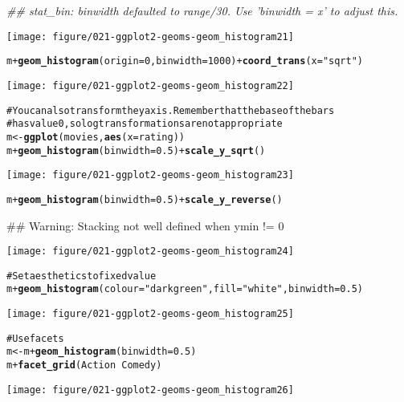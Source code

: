\documentclass[a4paper,titlepage]{tufte-handout}\usepackage{graphicx, color}
\makeatletter
\def\maxwidth{ %
  \ifdim\Gin@nat@width>\linewidth
    \linewidth
  \else
    \Gin@nat@width
  \fi
}
\newcommand{\hlfunctioncall}[1]{\textcolor[rgb]{0.501960784313725,0,0.329411764705882}{\textbf{#1}}}%
\newcommand{\hlstring}[1]{\textcolor[rgb]{0.6,0.6,1}{#1}}%
\newcommand{\hlcomment}[1]{\textcolor[rgb]{0.180392156862745,0.6,0.341176470588235}{#1}}%
\newenvironment{kframe}{%
 \def\at@end@of@kframe{}%
 \ifinner\ifhmode%
  \def\at@end@of@kframe{\end{minipage}}%
  \begin{minipage}{\columnwidth}%
 \fi\fi%
 \def\FrameCommand##1{\hskip\@totalleftmargin \hskip-\fboxsep
 \colorbox{shadecolor}{##1}\hskip-\fboxsep
     \hskip-\linewidth \hskip-\@totalleftmargin \hskip\columnwidth}%
 \MakeFramed {\advance\hsize-\width
   \@totalleftmargin\z@ \linewidth\hsize
   \@setminipage}}%
 {\par\unskip\endMakeFramed%
 \at@end@of@kframe}
\newenvironment{knitrout}{}{} %
\makeatother
\begin{document}
\begin{knitrout}
\begin{kframe}
{\ttfamily\noindent\itshape\textcolor{messagecolor}{\#\# stat\_bin: binwidth defaulted to range/30. Use 'binwidth = x' to adjust this.}}\end{kframe}
\texttt{[image: figure/021-ggplot2-geoms-geom\_histogram21]} 
\begin{kframe}\begin{alltt}
m + \hlfunctioncall{geom_histogram}(origin = 0, binwidth = 1000) + \hlfunctioncall{coord_trans}(x = \hlstring{"sqrt"})
\end{alltt}
\end{kframe}
\texttt{[image: figure/021-ggplot2-geoms-geom\_histogram22]} 
\begin{kframe}\begin{alltt}

\hlcomment{# You can also transform the y axis.  Remember that the base of the bars}
\hlcomment{# has value 0, so log transformations are not appropriate}
m <- \hlfunctioncall{ggplot}(movies, \hlfunctioncall{aes}(x = rating))
m + \hlfunctioncall{geom_histogram}(binwidth = 0.5) + \hlfunctioncall{scale_y_sqrt}()
\end{alltt}
\end{kframe}
\texttt{[image: figure/021-ggplot2-geoms-geom\_histogram23]} 
\begin{kframe}\begin{alltt}
m + \hlfunctioncall{geom_histogram}(binwidth = 0.5) + \hlfunctioncall{scale_y_reverse}()
\end{alltt}


{\ttfamily\noindent\textcolor{warningcolor}{\#\# Warning: Stacking not well defined when ymin != 0}}\end{kframe}
\texttt{[image: figure/021-ggplot2-geoms-geom\_histogram24]} 
\begin{kframe}\begin{alltt}

\hlcomment{# Set aesthetics to fixed value}
m + \hlfunctioncall{geom_histogram}(colour = \hlstring{"darkgreen"}, fill = \hlstring{"white"}, binwidth = 0.5)
\end{alltt}
\end{kframe}
\texttt{[image: figure/021-ggplot2-geoms-geom\_histogram25]} 
\begin{kframe}\begin{alltt}

\hlcomment{# Use facets}
m <- m + \hlfunctioncall{geom_histogram}(binwidth = 0.5)
m + \hlfunctioncall{facet_grid}(Action ~ Comedy)
\end{alltt}
\end{kframe}
\texttt{[image: figure/021-ggplot2-geoms-geom\_histogram26]} 
\begin{kframe}\begin{alltt}


\end{alltt}
\end{kframe}
\end{knitrout}
\end{document}
